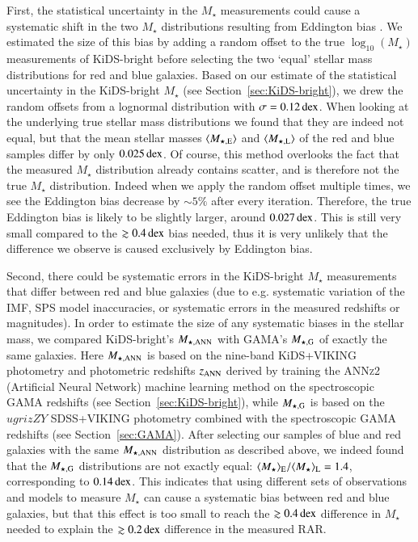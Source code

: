 \documentclass{aa}
\newcommand{\dex}{\,{\rm dex}}
\newcommand{\lan}{\langle}
\newcommand{\ran}{\rangle}
\newcommand{\un}[1]{_{\rm #1}}
\begin{document}
First, the statistical uncertainty in the $M_\star$ measurements could cause a systematic shift in the two $M_\star$ distributions resulting from Eddington bias \cite[]{eddington1913}. We estimated the size of this bias by adding a random offset to the true $\log_{10}(M_\star)$ measurements of KiDS-bright before selecting the two `equal' stellar mass distributions for red and blue galaxies. Based on our estimate of the statistical uncertainty in the KiDS-bright $M_\star$ (see Section~\ref{sec:KiDS-bright}), we drew the random offsets from a lognormal distribution with $\sigma = 0.12 \dex$. When looking at the underlying true stellar mass distributions we found that they are indeed not equal, but that the mean stellar masses $\lan M\un{\star,E} \ran$ and $\lan M\un{\star,L} \ran$ of the red and blue samples differ by only $0.025 \dex$. Of course, this method overlooks the fact that the measured $M_\star$ distribution already contains scatter, and is therefore not the true $M_\star$ distribution. Indeed when we apply the random offset multiple times, we see the Eddington bias decrease by $\sim5\%$ after every iteration. Therefore, the true Eddington bias is likely to be slightly larger, around $0.027 \dex$. This is still very small compared to the $\gtrsim 0.4 \dex$ bias needed, thus it is very unlikely that the difference we observe is caused exclusively by Eddington bias.

Second, there could be systematic errors in the KiDS-bright $M_\star$ measurements that differ between red and blue galaxies (due to e.g. systematic variation of the IMF, SPS model inaccuracies, or systematic errors in the measured redshifts or magnitudes). In order to estimate the size of any systematic biases in the stellar mass, we compared KiDS-bright's $M\un{\star,ANN}$ with GAMA's $M\un{\star,G}$ of exactly the same galaxies. Here $M\un{\star,ANN}$ is based on the nine-band KiDS+VIKING photometry and photometric redshifts $z\un{ANN}$ derived by training the \textsc{ANNz2} (Artificial Neural Network) machine learning method on the spectroscopic GAMA redshifts (see Section~\ref{sec:KiDS-bright}), while $M\un{\star,G}$ is based on the $ugrizZY$ SDSS+VIKING photometry combined with the spectroscopic GAMA redshifts (see Section~\ref{sec:GAMA}). After selecting our samples of blue and red galaxies with the same $M\un{\star,ANN}$ distribution as described above, we indeed found that the $M\un{\star,G}$ distributions are not exactly equal: $\langle M_\star \rangle\un{E} / \langle M_\star\rangle\un{L} = 1.4$, corresponding to $0.14 \dex$. This indicates that using different sets of observations and models to measure $M_\star$ can cause a systematic bias between red and blue galaxies, but that this effect is too small to reach the $\gtrsim 0.4 \dex$ difference in $M_\star$ needed to explain the $\gtrsim 0.2 \dex$ difference in the measured RAR.
\end{document}
